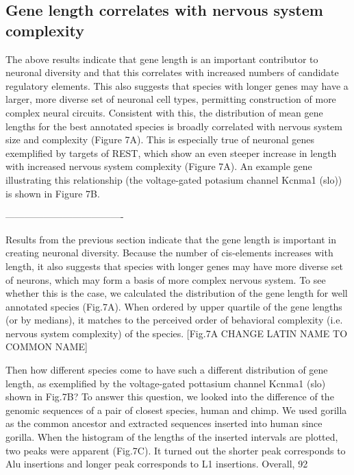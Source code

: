 \subsection{Gene length correlates with nervous system complexity}

The above results indicate that gene length is an important contributor to neuronal diversity and that this correlates with increased numbers of candidate regulatory elements. This also suggests that species with longer genes may have a larger, more diverse set of neuronal cell types, permitting construction of more complex neural circuits. Consistent with this, the distribution of mean gene lengths for the best annotated species is broadly correlated with nervous system size and complexity (Figure 7A). This is especially true of neuronal genes exemplified by targets of REST, which show an even steeper increase in length with increased nervous system complexity (Figure 7A). An example gene illustrating this relationship (the voltage-gated potasium channel Kcnma1 (slo)) is shown in Figure 7B. 

-------------------------------------

Results from the previous section indicate that the gene length is important in creating neuronal diversity. Because the number of cis-elements increases with length, it also suggests that species with longer genes may have more diverse set of neurons, which may form a basis of more complex nervous system. To see whether this is the case, we calculated the distribution of the gene length for well annotated species (Fig.7A). When ordered by upper quartile of the gene lengths (or by medians), it matches to the perceived order of behavioral complexity (i.e. nervous system complexity) of the species. [Fig.7A CHANGE LATIN NAME TO COMMON NAME]

Then how different species come to have such a different distribution of gene length, as exemplified by the voltage-gated pottasium channel Kcnma1 (slo) shown in Fig.7B? To answer this question, we looked into the difference of the genomic sequences of a pair of closest species, human and chimp. We used gorilla as the common ancestor and extracted sequences inserted into human since gorilla. When the histogram of the lengths of the inserted intervals are plotted, two peaks were apparent (Fig.7C). It turned out the shorter peak corresponds to Alu insertions and longer peak corresponds to L1 insertions. Overall, 92%

